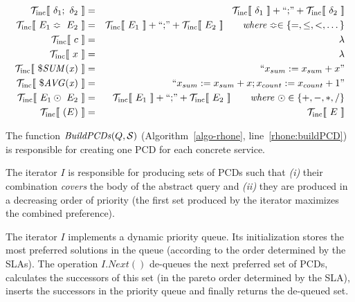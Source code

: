 \begin{eqnarray*}
\tqS{\delta_1 ; \ \delta_2} 	& = & \tqS{\delta_1} + \hbox{``;''} + \tqS{\delta_2} \\
\tqS{E_1 \Bumpeq \ E_2} 		& = & \tqS{E_1} + \hbox{``;''} + \tqS{E_2}
									\qquad \mathit{where} \Bumpeq \in \{ =, \leq, <, \dots \}\\
\tqS{c} 						& = & \lambda \\
\tqS{x} 						& = & \lambda \\
\tqS{\$\mathit{SUM(x)}} 		& = & \hbox{``$x_{sum} := x_{sum} + x$''} \\
\tqS{\$\mathit{AVG(x)}} 		& = & \hbox{``$x_{sum}:= x_{sum} + x ; x_{count} := x_{count} + 1$''} \\
\tqS{E_1 \odot \ E_2}		& = & \tqS{E_1} + \hbox{``;''} + \tqS{E_2} 
									\qquad \mathit{where}\ \odot \in \{ +, -, *, / \}\\
\tqS{( E )} 					& = & \tqS{E}
\end{eqnarray*}

The function $\mathit{BuildPCDs}(Q, \hbox{${\cal S}$})$ (Algorithm~\ref{algo-rhone}, line~\ref{rhone:buildPCD}) is responsible for creating one PCD for each concrete service.

The iterator $I$ is responsible for producing sets of PCDs such that \textit{(i)} their combination \textit{covers} the body of the abstract query and \textit{(ii)} they are produced in a decreasing order of priority (the first set produced by the iterator maximizes the combined preference).

The iterator $I$ implements a dynamic priority queue. 
Its initialization stores the most preferred solutions in the queue (according to the order determined by the SLAs).
The operation $I.\mathit{Next}()$ de-queues the next preferred set of PCDs, calculates the successors of this set (in the pareto order determined by the SLA), inserts the successors in the priority queue and finally returns the de-queued set.